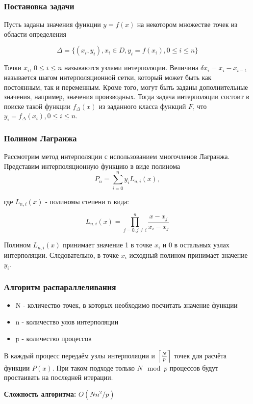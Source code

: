 \documentclass[pdf, hyperref={unicode}, aspectratio=169]{beamer}
\DeclarePairedDelimiter\ceil{\lceil}{\rceil}
\begin{document}
{
\frame{\titlepage}
}

\begin{frame}
\frametitle{Постановка задачи}


Пусть заданы значения функции $y = f (x)$ на некотором множестве точек из области определения

$$
    \Delta = \{(x_i, y_i), x_i \in D, y_i = f(x_i), 0 \le i \le n\}
$$

Точки $x_i$, $0 \le i \le n $ называются узлами интерполяции. Величина $\delta x_i = x_i - x_{i-1}$ называется шагом интерполяционной сетки, который может быть как постоянным, так и переменным. Кроме того, могут быть заданы дополнительные значения, например, значения производных. Тогда задача интерполяции состоит в поиске такой функции $f_\Delta(x)$ из заданного класса функций $F$, что $y_i = f_\Delta(x_i), 0 \le i \le n$.

\end{frame}


\begin{frame}
\frametitle{Полином Лагранжа}

Рассмотрим метод интерполяции с использованием многочленов Лагранжа. Представим интерполяционную функцию в виде полинома
$$
    P_n = \sum_{i=0}^{n} y_iL_{n, i}(x),
$$

где $L_{n, i}(x)$ - полиномы степени n вида:

$$
    L_{n, i}(x) = \prod_{j = 0, j \neq i}^{n} \frac{x - x_j}{x_i - x_j}
$$

Полином $L_{n, i}(x)$ принимает значение 1 в точке $x_i$ и $0$ в остальных узлах интерполяции. Следовательно, в точке $x_i$ исходный полином принимает значение $y_i$.

\end{frame}



\begin{frame}
\frametitle{Алгоритм распараллеливания}

\begin{itemize}

\item N - количество точек, в которых необходимо посчитать значение функции
\item n - количество улов интерполяции
\item p - количество процессов

\end{itemize}

В каждый процесс передаём узлы интерполяции и $\ceil*{\frac{N}{p}}$ точек для расчёта функции $P(x)$. При таком подходе только $N \mod p$ процессов будут простаивать на последней итерации.

\textbf{Сложность алгоритма:} $O( Nn^2 / p)$


\end{frame}
\end{document}
